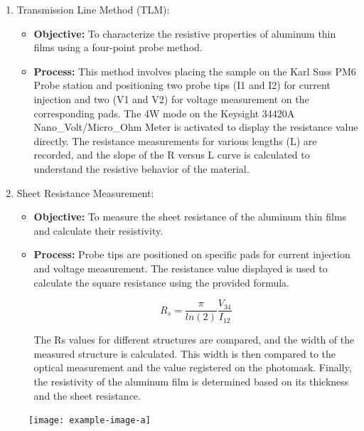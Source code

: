 \documentclass[a4paper, table]{article}
\begin{document}
\begin{enumerate}
    \item Transmission Line Method (TLM):
    \begin{itemize}
        \item \textbf{Objective:} To characterize the resistive properties of aluminum thin films using a four-point probe method.
        \item \textbf{Process:} This method involves placing the sample on the Karl Suss PM6 Probe station and positioning two probe tips (I1 and I2) for current injection and two (V1 and V2) for voltage measurement on the corresponding pads. The 4W mode on the Keysight 34420A Nano\_Volt/Micro\_Ohm Meter is activated to display the resistance value directly. The resistance measurements for various lengths (L) are recorded, and the slope of the R versus L curve is calculated to understand the resistive behavior of the material.
    \end{itemize}
    
    \item Sheet Resistance Measurement:
    \begin{itemize}
        \item \textbf{Objective:} To measure the sheet resistance of the aluminum thin films and calculate their resistivity.
        \item \textbf{Process:} Probe tips are positioned on specific pads for current injection and voltage measurement. The resistance value displayed is used to calculate the square resistance using the provided formula. 
        
        \[R_s = \frac{\pi}{ln(2)} \frac{V_{34}}{I_{12}}\]
        
        The Rs values for different structures are compared, and the width of the measured structure is calculated. This width is then compared to the optical measurement and the value registered on the photomask. Finally, the resistivity of the aluminum film is determined based on its thickness and the sheet resistance.
    \end{itemize}
\end{enumerate}


\begin{figure}[h]
\centering
\begin{minipage}{0.35\textwidth}         %
  \centering
  \texttt{[image: example-image-a]}
\end{minipage}
\end{figure}
\end{document}
